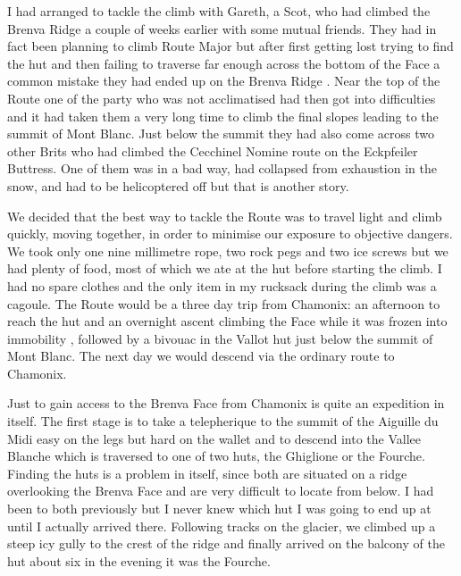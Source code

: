 \documentclass[a5paper,openany,font 10pt]{scrbook}
\begin{document}
I had arranged to tackle the climb with Gareth, a Scot, who
had climbed the  Brenva Ridge  a couple of weeks earlier with some
mutual friends. They had in fact been planning to climb  Route
Major  but after first getting lost trying to find the hut and
then failing to traverse far enough across the bottom of the Face
 a common mistake  they had ended up on the  Brenva Ridge . Near
the top of the Route one of the party who was not acclimatised
had then got into difficulties and it had taken them a very long
time to climb the final slopes leading to the summit of Mont
Blanc. Just below the summit they had also come across two other
Brits  who had climbed the  Cecchinel Nomine  route on the
Eckpfeiler Buttress. One of them was in a bad way, had collapsed
from exhaustion in the snow, and had to be helicoptered off   but
that is another story.

We decided that the best way to tackle the Route was to
travel light and climb quickly, moving together, in order to
minimise our exposure to objective dangers. We took only one nine
millimetre rope, two rock pegs and two ice screws but we had
plenty of food, most of which we ate at the hut before starting
the climb. I had no spare clothes and the only item in my
rucksack during the climb was a cagoule. The Route would be a
three day trip from Chamonix: an afternoon to reach the hut and
an overnight ascent  climbing the Face while it was frozen into
immobility , followed by a bivouac in the Vallot hut just below
the summit of Mont Blanc. The next day we would descend via the
ordinary route to Chamonix.

Just to gain access to the Brenva Face from Chamonix is
quite an expedition in itself. The first stage is to take a
telepherique to the summit of the Aiguille du Midi  easy on the
legs but hard on the wallet  and to descend into the Vallee
Blanche which is traversed to one of two huts, the Ghiglione or
the Fourche. Finding the huts is a problem in itself, since both
are situated on a ridge overlooking the Brenva Face and are very
difficult to locate from below. I had been to both previously but
I never knew which hut I was going to end up at until I actually
arrived there. Following tracks on the glacier, we climbed up a
steep icy gully to the crest of the ridge and finally arrived on
the balcony of the hut about six in the evening  it was the
Fourche.
\end{document}
